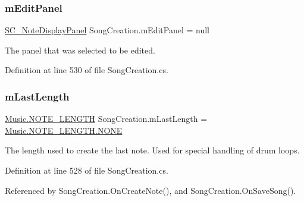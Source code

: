 \mbox{\label{group___s_c_priv_var_ga0f5cfc2d0492190ded3fbda5b43b45e4}} 
\subsubsection{\texorpdfstring{m\+Edit\+Panel}{mEditPanel}}
{\footnotesize\ttfamily \hyperlink{class_s_c___note_display_panel}{S\+C\+\_\+\+Note\+Display\+Panel} Song\+Creation.\+m\+Edit\+Panel = null\hspace{0.3cm}{\ttfamily [private]}}



The panel that was selected to be edited. 



Definition at line 530 of file Song\+Creation.\+cs.

\mbox{\label{group___s_c_priv_var_ga220707a4bf66dc6fee4e7bc9b7f2ed60}} 
\subsubsection{\texorpdfstring{m\+Last\+Length}{mLastLength}}
{\footnotesize\ttfamily \hyperlink{group___music_enums_gaf11b5f079adbb21c800b9eca1c5c3cbd}{Music.\+N\+O\+T\+E\+\_\+\+L\+E\+N\+G\+TH} Song\+Creation.\+m\+Last\+Length = \hyperlink{group___music_enums_ggaf11b5f079adbb21c800b9eca1c5c3cbdab50339a10e1de285ac99d4c3990b8693}{Music.\+N\+O\+T\+E\+\_\+\+L\+E\+N\+G\+T\+H.\+N\+O\+NE}\hspace{0.3cm}{\ttfamily [private]}}



The length used to create the last note. Used for special handling of drum loops. 



Definition at line 528 of file Song\+Creation.\+cs.



Referenced by Song\+Creation.\+On\+Create\+Note(), and Song\+Creation.\+On\+Save\+Song().

\mbox{\label{group___s_c_priv_var_ga370237b50bc11a581fc963cdd8ffd4ea}} 
